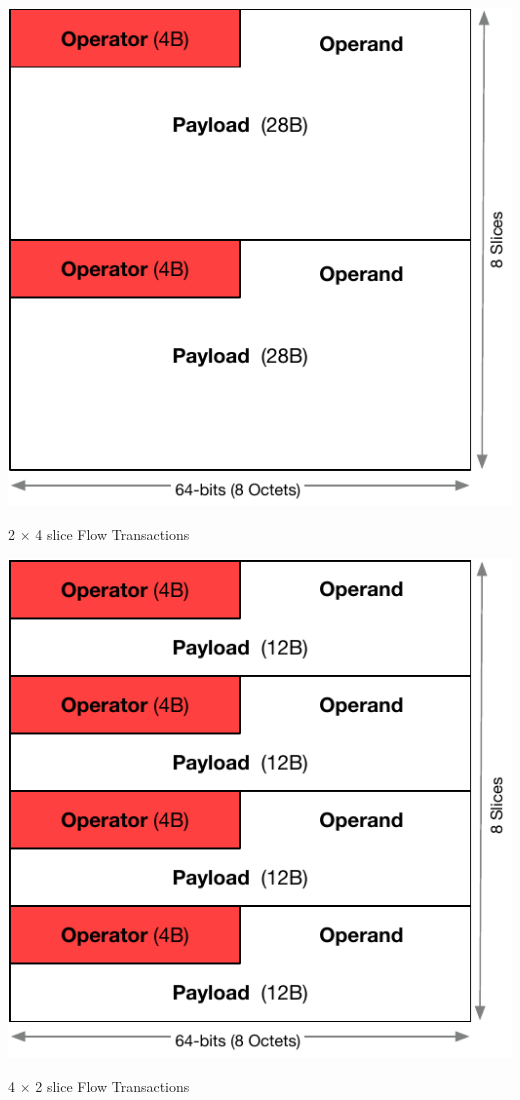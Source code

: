 \documentclass[../../../OAE-SPEC-MAIN.tex]{subfiles}
\begin{document}
\begin{marginfigure}
  \includegraphics[width=\linewidth]{./figures/2-flow-subtransactions.pdf}
  \caption{2 $\times$ 4 slice Flow Transactions }
  \vspace{8pt}
\end{marginfigure}

\begin{marginfigure}
  \includegraphics[width=\linewidth]{./figures/4-flow-subtransactions.pdf}
  \caption{4 $\times$ 2 slice Flow Transactions}
  \vspace{8pt}
\end{marginfigure}
\end{document}
